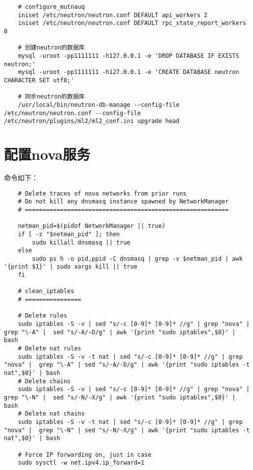\documentclass[a4paper,left=1.5cm,right=1.5cm,11pt]{article}
\begin{document}
\begin{lstlisting}
	# configure_mutnauq
	iniset /etc/neutron/neutron.conf DEFAULT api_workers 2
	iniset /etc/neutron/neutron.conf DEFAULT rpc_state_report_workers 0

	# 创建neutron的数据库
	mysql -uroot -pp1111111 -h127.0.0.1 -e 'DROP DATABASE IF EXISTS neutron;'
	mysql -uroot -pp1111111 -h127.0.0.1 -e 'CREATE DATABASE neutron CHARACTER SET utf8;'
	
	# 同步neutron的数据库
	/usr/local/bin/neutron-db-manage --config-file /etc/neutron/neutron.conf --config-file /etc/neutron/plugins/ml2/ml2_conf.ini upgrade head
	\end{lstlisting}

\section{配置nova服务}
	命令如下：
	\begin{lstlisting}
	# Delete traces of nova networks from prior runs
    # Do not kill any dnsmasq instance spawned by NetworkManager
	# ==========================================================

	netman_pid=$(pidof NetworkManager || true)
	if [ -z "$netman_pid" ]; then
        sudo killall dnsmasq || true
    else
        sudo ps h -o pid,ppid -C dnsmasq | grep -v $netman_pid | awk '{print $1}' | sudo xargs kill || true
    fi

	# clean_iptables
	# ================

	# Delete rules
    sudo iptables -S -v | sed "s/-c [0-9]* [0-9]* //g" | grep "nova" | grep "\-A" |  sed "s/-A/-D/g" | awk '{print "sudo iptables",$0}' | bash
    # Delete nat rules
    sudo iptables -S -v -t nat | sed "s/-c [0-9]* [0-9]* //g" | grep "nova" |  grep "\-A" | sed "s/-A/-D/g" | awk '{print "sudo iptables -t nat",$0}' | bash
    # Delete chains
    sudo iptables -S -v | sed "s/-c [0-9]* [0-9]* //g" | grep "nova" | grep "\-N" |  sed "s/-N/-X/g" | awk '{print "sudo iptables",$0}' | bash
    # Delete nat chains
    sudo iptables -S -v -t nat | sed "s/-c [0-9]* [0-9]* //g" | grep "nova" |  grep "\-N" | sed "s/-N/-X/g" | awk '{print "sudo iptables -t nat",$0}' | bash

	# Force IP forwarding on, just in case
    sudo sysctl -w net.ipv4.ip_forward=1
	\end{lstlisting}
\end{document}
